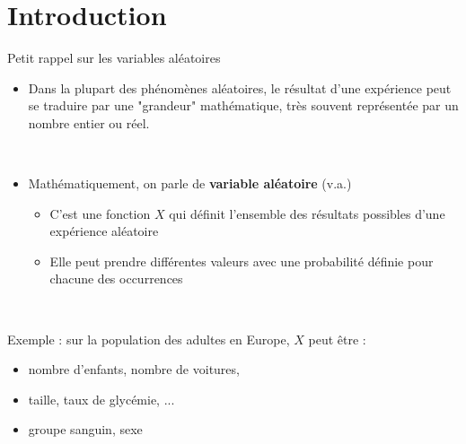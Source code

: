 \documentclass{beamer}
\begin{document}
 \section{Introduction}
\begin{frame}{Petit rappel sur les variables aléatoires}

\begin{itemize}
\item Dans la plupart des phénomènes aléatoires, le résultat d'une expérience peut se traduire par une "grandeur" mathématique, très souvent représentée par un nombre entier ou réel.

\

\item Mathématiquement, on parle de {\bf variable aléatoire} (v.a.) 
\begin{itemize}
\item C'est une fonction $X$ qui définit l'ensemble des résultats possibles d'une expérience aléatoire
\item Elle peut prendre différentes valeurs avec une probabilité définie pour chacune des occurrences
\end{itemize}
\end{itemize}

\

Exemple : sur la population des adultes en Europe, $X$ peut être :
\begin{itemize}
\item nombre d'enfants, nombre de voitures, 
\item taille, taux de glycémie, ...
\item groupe sanguin, sexe
\end{itemize} 
\end{frame}

\end{document}
